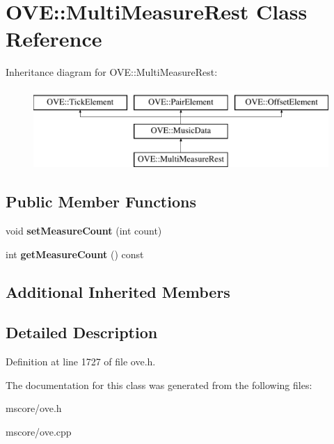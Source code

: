 \hypertarget{class_o_v_e_1_1_multi_measure_rest}{}\section{O\+VE\+:\+:Multi\+Measure\+Rest Class Reference}
\label{class_o_v_e_1_1_multi_measure_rest}
Inheritance diagram for O\+VE\+:\+:Multi\+Measure\+Rest\+:\begin{figure}[H]
\begin{center}
\leavevmode
\includegraphics[height=3.000000cm]{class_o_v_e_1_1_multi_measure_rest}
\end{center}
\end{figure}
\subsection*{Public Member Functions}
\begin{DoxyCompactItemize}
\item 
\mbox{\label{class_o_v_e_1_1_multi_measure_rest_a437c994e09aedb9182077063728a70f7}} 
void {\bfseries set\+Measure\+Count} (int count)
\item 
\mbox{\label{class_o_v_e_1_1_multi_measure_rest_ada171d7a77b54854174ea662511bf46f}} 
int {\bfseries get\+Measure\+Count} () const
\end{DoxyCompactItemize}
\subsection*{Additional Inherited Members}


\subsection{Detailed Description}


Definition at line 1727 of file ove.\+h.



The documentation for this class was generated from the following files\+:\begin{DoxyCompactItemize}
\item 
mscore/ove.\+h\item 
mscore/ove.\+cpp\end{DoxyCompactItemize}
